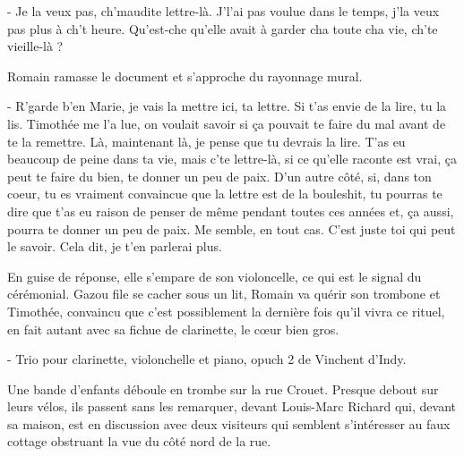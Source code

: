 - Je la veux pas, ch’maudite lettre-là. J’l’ai pas voulue dans le temps, j’la veux pas plus à ch’t heure. Qu’est-che qu’elle avait à garder cha toute cha vie, ch’te vieille-là ?

Romain ramasse le document et s’approche du rayonnage mural.

- R’garde b’en Marie, je vais la mettre ici, ta lettre. Si t’as envie de la lire, tu la lis. Timothée me l’a lue, on voulait savoir si ça pouvait te faire du mal avant de te la remettre. Là, maintenant là, je pense que tu devrais la lire. T’as eu beaucoup de peine dans ta vie, mais c’te lettre-là, si ce qu’elle raconte est vrai, ça peut te faire du bien, te donner un peu de paix. D’un autre côté, si, dans ton coeur, tu es vraiment convaincue que la lettre est de la bouleshit, tu pourras te dire que t’as eu raison de penser de même pendant toutes ces années et, ça aussi, pourra te donner un peu de paix. Me semble, en tout cas. C’est juste toi qui peut le savoir. Cela dit, je t’en parlerai plus.

En guise de réponse, elle s’empare de son violoncelle, ce qui est le signal du cérémonial. Gazou file se cacher sous un lit, Romain va quérir son trombone et Timothée, convaincu que c’est possiblement la dernière fois qu’il vivra ce rituel, en fait autant avec sa fichue de clarinette, le cœur bien gros.

- Trio pour clarinette, violonchelle et piano, opuch 2 de Vinchent d’Indy.

Une bande d’enfants déboule en trombe sur la rue Crouet. Presque debout sur leurs vélos, ils passent sans les remarquer, devant Louis-Marc Richard qui, devant sa maison, est en discussion avec deux visiteurs qui semblent s’intéresser au faux cottage obstruant la vue du côté nord de la rue. 